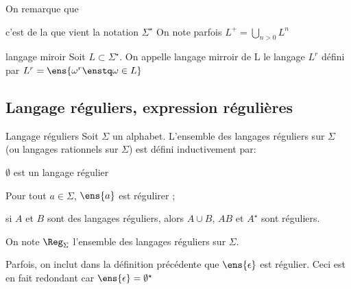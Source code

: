     On remarque que
    \begin{enumerate}
        \itt c'est de la que vient la notation $\Sigma^\star$
        \itt On note parfois $L^+ = \bigcup_{n > 0} L^n$
    \end{enumerate}
    
    \begin{definition}{langage miroir}{}
        Soit $L \subset \Sigma^\star$. On appelle langage mirroir de L le langage $L^r$ défini par $L^r = \ens{\omega^r \enstq \omega \in L}$
        
    \end{definition}
    
    \subsection{Langage réguliers, expression régulières}
    
    \begin{definition}{Langage réguliers}{} 
        Soit $\Sigma$ un alphabet. L'ensemble des langages réguliers sur $\Sigma$ (ou langages rationnels sur $\Sigma$) est défini inductivement par: 
        \begin{enumerate}
            \itast $\emptyset$ est un langage régulier
            
            \itast  Pour tout $a \in \Sigma$, $\ens{a}$ est régulirer ;
            
            \itast si $A$ et $B$ sont des langages réguliers, alors $A \cup B$, $AB$ et $A^\star$ sont réguliers.
            
        \end{enumerate}
    \end{definition}
    \begin{notation}
        On note $\Reg_\Sigma$ l'ensemble des langages réguliers sur $\Sigma$.
    \end{notation}
    
    Parfois, on inclut dans la définition précédente que $\ens{\epsilon}$ est régulier. Ceci est en fait redondant car $\ens{\epsilon} = \emptyset^\star$
    

